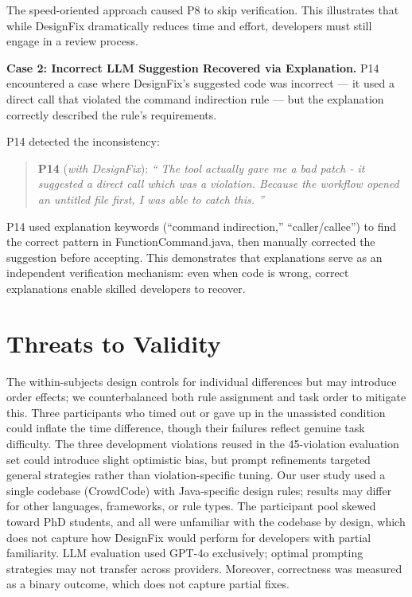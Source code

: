 \documentclass[conference]{IEEEtran}
\newcommand{\pquote}[3]{%
\vspace{2pt}
\begin{quote}\small
\textbf{#1} (\emph{#2}): \emph{``#3''}
\end{quote}
\vspace{2pt}
}
\begin{document}
\noindent The speed-oriented approach caused P8 to skip verification. This illustrates that while DesignFix dramatically reduces time and effort, developers must still engage in a review process.

\textbf{Case 2: Incorrect LLM Suggestion Recovered via Explanation.} P14 encountered a case where DesignFix's suggested code was incorrect --- it used a direct call that violated the command indirection rule ---  but the explanation correctly described the rule's requirements.

P14 detected the inconsistency: 
\pquote{P14}{with DesignFix}{
The tool actually gave me a bad patch - it suggested a direct call which was a violation. Because the workflow opened an untitled file first, I was able to catch this.
}


\noindent P14 used explanation keywords (``command indirection,'' ``caller/callee'') to find the correct pattern in FunctionCommand.java, then manually corrected the suggestion before accepting. This demonstrates that explanations serve as an independent verification mechanism: even when code is wrong, correct explanations enable skilled developers to recover.


\section{Threats to Validity}

The within-subjects design controls for individual differences but may introduce order effects; we counterbalanced both rule assignment and task order to mitigate this. Three participants who timed out or gave up in the unassisted condition could inflate the time difference, though their failures reflect genuine task difficulty. The three development violations reused in the 45-violation evaluation set could introduce slight optimistic bias, but prompt refinements targeted general strategies rather than violation-specific tuning.
Our user study used a single codebase (CrowdCode) with Java-specific design rules; results may differ for other languages, frameworks, or rule types. The participant pool skewed toward PhD students, and all were unfamiliar with the codebase by design, which does not capture how DesignFix would perform for developers with partial familiarity. LLM evaluation used GPT-4o exclusively; optimal prompting strategies may not transfer across providers. Moreover, correctness was measured as a binary outcome, which does not capture partial fixes. 
\end{document}
